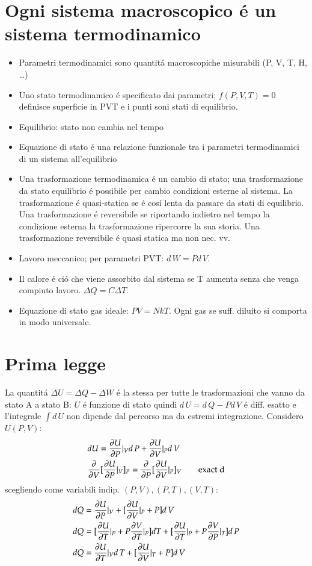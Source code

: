     \chapter{Ogni sistema macroscopico \'e un sistema termodinamico}
        \begin{itemize}
        \item Parametri termodinamici sono quantit\'a macroscopiche misurabili (P, V, T, H, \ldots)
        \item Uno stato termodinamico \'e specificato dai parametri; $f(P,V,T)=0$ definisce superficie in PVT e i punti soni stati di equilibrio.
        \item Equilibrio: stato non cambia nel tempo
        \item Equazione di stato \'e una relazione funzionale tra i parametri termodinamici di un sistema all'equilibrio
        \item Una trasformazione termodinamica \'e un cambio di stato; una trasformazione da stato equilibrio \'e possibile per cambio condizioni esterne al sistema. La trasformazione \'e quasi-statica se \'e cos\'i lenta da passare da stati di equilibrio. Una trasformazione \'e reversibile se riportando indietro nel tempo la condizione esterna la trasformazione ripercorre la sua storia. Una trasformazione reversibile \'e quasi statica ma non nec. vv.
        \item Lavoro meccanico; per parametri PVT: $d\,W=Pd\,V$.
        \item Il calore \'e ci\'o che viene assorbito dal sistema se T aumenta senza che venga compiuto lavoro. $\Delta Q=C\Delta T$.
        \item Equazione di stato gas ideale: $PV=NkT$. Ogni gas se suff. diluito si comporta in modo universale.
        \end{itemize}
    \chapter{Prima legge}
        La quantit\'a $\Delta U=\Delta Q-\Delta W$ \'e la stessa per tutte le trasformazioni che vanno da stato A a stato B: $U$ \'e funzione di stato quindi $d\,U=d\,Q-Pd\,V$ \'e diff. esatto e l'integrale $\int d\,U$ non dipende dal percorso ma da estremi integrazione. Considero $U(P,V)$:
        \begin{align*}
        &dU=\PDy{P}{U}|_Vd\,P+\PDy{V}{U}|_Pd\,V\\
        &\PDof{V}[\PDy{P}{U}|_V]_P=\PDof{P}[\PDy{V}{U}|_P]_V\tag*{exact d}
        \end{align*}
        scegliendo come variabili indip. $(P,V), (P,T), (V,T)$:
        \begin{align*}
            &dQ=\PDy{P}{U}|_V+[\PDy{V}{U}|_P+P]d\,V\\
            &dQ=[\PDy{T}{U}|_P+P\PDy{T}{V}|_P]dT+[\PDy{T}{U}|_P+P\PDy{P}{V}|_T]d\,P\\
            &dQ=\PDy{T}{U}|_Vd\,T+[\PDy{V}{U}|_T+P]d\,V
        \end{align*}
